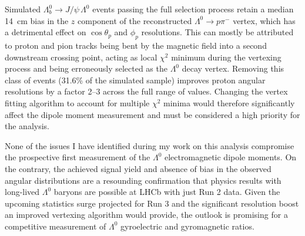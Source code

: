 \documentclass[12pt,a4paper]{book}
\newcommand{\demonstratorshort}{$\Lambda_b^0 \rightarrow J/\psi\,\Lambda^0$\xspace}
\newcommand{\lz}{$\Lambda^0$\xspace}
\newcommand{\lambdadecay}{$\Lambda^0 \rightarrow p\pi^-$\xspace}
\newcommand{\cthetap}{$\cos\theta_p$\xspace}
\newcommand{\phip}{$\phi_p$\xspace}
\begin{document}
Simulated \demonstratorshort events passing the full selection process retain a median \SI{14}{\centi\meter} bias in the $z$ component of the reconstructed \lambdadecay vertex, which has a detrimental effect on \cthetap and \phip resolutions.
This can mostly be attributed to proton and pion tracks being bent by the magnetic field into a second downstream crossing point, acting as local $\chi^2$ minimum during the vertexing process and being erroneously selected as the \lz decay vertex.
Removing this class of events (31.6\% of the simulated sample) improves proton angular resolutions by a factor 2--3 across the full range of values.
Changing the vertex fitting algorithm to account for multiple $\chi^2$ minima would therefore significantly affect the dipole moment measurement and must be considered a high priority for the analysis.

None of the issues I have identified during my work on this analysis compromise the prospective first measurement of the \lz electromagnetic dipole moments.
On the contrary, the achieved signal yield and absence of bias in the observed angular distributions are a resounding confirmation that physics results with long-lived \lz baryons are possible at LHCb with just Run 2 data.
Given the upcoming statistics surge projected for Run 3 and the significant resolution boost an improved vertexing algorithm would provide, the outlook is promising for a competitive measurement of \lz gyroelectric and gyromagnetic ratios.
\end{document}
